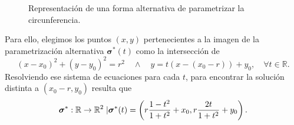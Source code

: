 \begin{example}
\begin{figure}[H]
\begin{center}
      \caption{Representación de una forma alternativa de parametrizar la circunferencia.}
      \end{center}
  \end{figure}
  Para ello, elegimos los puntos $(x,y)$ pertenecientes a la imagen de la parametrización alternativa $\boldsymbol{\sigma}^*(t)$ como la intersección de
        \begin{equation*}
          (x-x_0)^2+(y-y_0)^2=r^2 \quad\land\quad y=t(x-(x_0-r))+y_0,\quad \forall t\in \mathbb{R}.
        \end{equation*}
        Resolviendo ese sistema de ecuaciones para cada $t$, para encontrar la solución distinta a $(x_0-r,y_0)$ resulta que
        \begin{equation*}
          \boldsymbol{\sigma}^*:\mathbb{R}\rightarrow\mathbb{R}^2\;|\; \\ \boldsymbol{\sigma}^*(t)=\left(r\frac{1-t^2}{1+t^2}+x_0,r\frac{2t}{1+t^2}+y_0\right).
        \end{equation*}
    \end{example}
